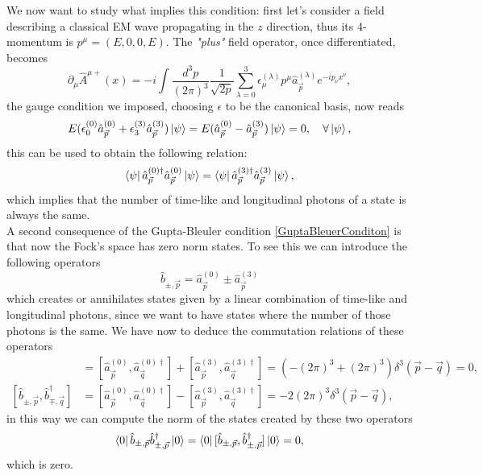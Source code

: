We now want to study what implies this condition: first let's consider a field describing a classical EM wave propagating in the $z$ direction, thus its 4-momentum is $p^\mu=(E,0,0,E)$. The \emph{"plus"} field operator, once differentiated, becomes
\begin{equation*}
    \partial_\mu\hat{A}^{\mu+}(x)=-i\int\frac{d^3p}{(2\pi)^3}\frac{1}{\sqrt{2p}}\sum_{\lambda=0}^{3}\epsilon_{\mu}^{(\lambda)}p^\mu\hat{a}_{\vec p}^{(\lambda)}e^{-ip_\nu x^\nu},
\end{equation*}
the gauge condition we imposed, choosing $\epsilon$ to be the canonical basis, now reads
\begin{equation*}
    E(\epsilon_0^{(0)}\hat{a}_{\vec p}^{(0)}+\epsilon_3^{(3)}\hat{a}_{\vec p}^{(3)})\ket{\psi}=E(\hat{a}_{\vec p}^{(0)}-\hat{a}_{\vec p}^{(3)})\ket{\psi}=0,\quad \forall\ket{\psi},
\end{equation*}
this can be used to obtain the following relation:
\begin{equation*}
    \bra{\psi}\hat{a}_{\vec p}^{(0)\dagger}\hat{a}_{\vec p}^{(0)}\ket{\psi}=\bra{\psi}\hat{a}_{\vec p}^{(3)\dagger}\hat{a}_{\vec p}^{(3)}\ket{\psi},
\end{equation*}
which implies that the number of time-like and longitudinal photons of a state is always the same.\\
A second consequence of the Gupta-Bleuler condition \ref{GuptaBleuerConditon} is that now the Fock's space has zero norm states. To see this we can introduce the following operators
\begin{equation*}
    \hat{b}_{\pm,\vec p}=\hat{a}_{\vec p}^{(0)}\pm\hat{a}_{\vec p}^{(3)}
\end{equation*} 
which creates or annihilates states given by a linear combination of time-like and longitudinal photons, since we want to have states where the number of those photons is the same. We have now to deduce the commutation relations of these operators
\begin{align*}
    [ \hat{b}_{\pm,\vec p}, \hat{b}^\dagger_{\pm,\vec q}]&=[\hat{a}^{(0)}_{\vec{p}},\hat{a}^{(0)\dagger}_{\vec{q}}]+[\hat{a}^{(3)}_{\vec{p}},\hat{a}^{(3)\dagger}_{\vec{q}}]=(-(2\pi)^3+(2\pi)^3)\delta^3(\vec p-\vec q)=0,\\
    [ \hat{b}_{\pm,\vec p}, \hat{b}^\dagger_{\mp,\vec q}]&=[\hat{a}^{(0)}_{\vec{p}},\hat{a}^{(0)\dagger}_{\vec{q}}]-[\hat{a}^{(3)}_{\vec{p}},\hat{a}^{(3)\dagger}_{\vec{q}}]=-2(2\pi)^3\delta^3(\vec p-\vec q),
\end{align*}
 in this way we can compute the norm of the states created by these two operators
 \begin{align*}
    \bra{0}\hat{b}_{\pm,\vec p}\hat{b}^\dagger_{\pm,\vec p}\ket{0}=\bra{0}[\hat{b}_{\pm,\vec p},\hat{b}^\dagger_{\pm,\vec p}]\ket{0}=0,
 \end{align*}
 which is zero.\\
 
